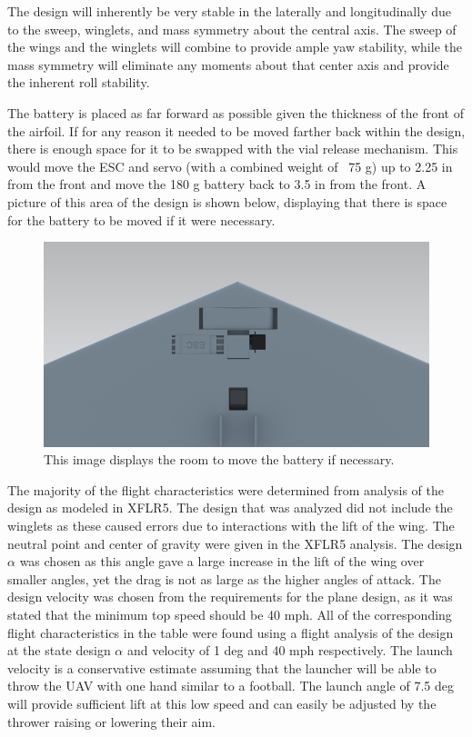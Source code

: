     The design will inherently be very stable in the laterally and longitudinally due to the sweep, winglets, and mass symmetry about the central axis. The sweep of the wings and the winglets will combine to provide ample yaw stability, while the mass symmetry will eliminate any moments about that center axis and provide the inherent roll stability. 
    
    The battery is placed as far forward as possible given the thickness of the front of the airfoil. If for any reason it needed to be moved farther back within the design, there is enough space for it to be swapped with the vial release mechanism. This would move the ESC and servo (with a combined weight of ~75 g) up to 2.25 in from the front and move the 180 g battery back to 3.5 in from the front. A picture of this area of the design is shown below, displaying that there is space for the battery to be moved if it were necessary.

    \begin{figure}[H]
        \centering
        \includegraphics[scale=0.5]{homeworks/homework4/report/Figure/battery_location.png}
        \caption{This image displays the room to move the battery if necessary.}
        \label{fig:Battery Location}
    \end{figure}

    The majority of the flight characteristics were determined from analysis of the design as modeled in XFLR5. The design that was analyzed did not include the winglets as these caused errors due to interactions with the lift of the wing. The neutral point and center of gravity were given in the XFLR5 analysis. The design $\alpha$ was chosen as this angle gave a large increase in the lift of the wing over smaller angles, yet the drag is not as large as the higher angles of attack. The design velocity was chosen from the requirements for the plane design, as it was stated that the minimum top speed should be 40 mph. All of the corresponding flight characteristics in the table were found using a flight analysis of the design at the state design $\alpha$ and velocity of 1 deg and 40 mph respectively. The launch velocity is a conservative estimate assuming that the launcher will be able to throw the UAV with one hand similar to a football. The launch angle of 7.5 deg will provide sufficient lift at this low speed and can easily be adjusted by the thrower raising or lowering their aim.

